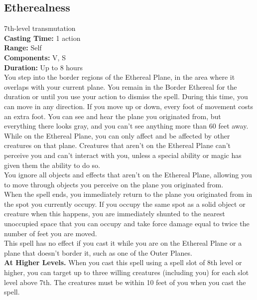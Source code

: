 \documentclass[11pt, A4paper, english]{article}
\begin{document}
		\subsection{Etherealness}
7th-level transmutation \\
\textbf{Casting Time:} 1 action \\
\textbf{Range:} Self \\
\textbf{Components:} V, S \\
\textbf{Duration:} Up to 8 hours \\
You step into the border regions of the Ethereal Plane, in the area where it overlaps with your current plane. You remain in the Border Ethereal for the duration or until you use your action to dismiss the spell. During this time, you can move in any direction. If you move up or down, every foot of movement costs an extra foot. You can see and hear the plane you originated from, but everything there looks gray, and you can’t see anything more than 60 feet away. \\
While on the Ethereal Plane, you can only affect and be affected by other creatures on that plane. Creatures that aren't on the Ethereal Plane can’t perceive you and can’t interact with you, unless a special ability or magic has given them the ability to do so. \\
You ignore all objects and effects that aren’t on the Ethereal Plane, allowing you to move through objects you perceive on the plane you originated from. \\
When the spell ends, you immediately return to the plane you originated from in the spot you currently occupy. If you occupy the same spot as a solid object or creature when this happens, you are immediately shunted to the nearest unoccupied space that you can occupy and take force damage equal to twice the number of feet you are moved. \\
This spell has no effect if you cast it while you are on the Ethereal Plane or a plane that doesn’t border it, such as one of the Outer Planes. \\
\textbf{At Higher Levels.} When you cast this spell using a spell slot of 8th level or higher, you can target up to three willing creatures (including you) for each slot level above 7th. The creatures must be within 10 feet of you when you cast the spell.
\end{document}
